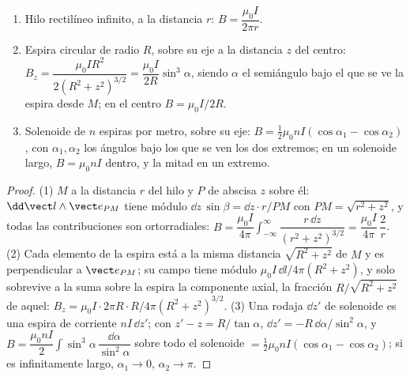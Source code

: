 \begin{proposition}\label{prop:b1:magnetostatics:three}
\begin{enumerate}
  \item Hilo rectilíneo infinito, a la distancia $r$: $B = \dfrac{\mu_0I}{2\pi r}$.
  \item Espira circular de radio $R$, sobre su eje a la distancia $z$ del
        centro: $B_z = \dfrac{\mu_0IR^2}{2(R^2 + z^2)^{3/2}} = \dfrac{\mu_0I}{2R}
        \sin^3\alpha$, siendo $\alpha$ el semiángulo bajo el que se ve la
        espira desde $M$; en el centro $B = \mu_0I/2R$.
  \item Solenoide de $n$ espiras por metro, sobre su eje: $B = \tfrac12\mu_0nI
        (\cos\alpha_1 - \cos\alpha_2)$, con $\alpha_1, \alpha_2$ los ángulos bajo
        los que se ven los dos extremos; en un solenoide largo, $B = \mu_0nI$
        dentro, y la mitad en un extremo.
\end{enumerate}
\end{proposition}

\begin{proof}
(1) $M$ a la distancia $r$ del hilo y $P$ de abscisa $z$ sobre él:
$\dd\vect l\wedge\vect e_{PM}$ tiene módulo $\dd z\,\sin\beta = \dd z\cdot r/PM$
con $PM = \sqrt{r^2 + z^2}$, y todas las contribuciones son ortorradiales:
$B = \dfrac{\mu_0I}{4\pi}\displaystyle\int_{-\infty}^{\infty}\dfrac{r\,\dd z}{(r^2 + z^2)^{3/2}}
= \dfrac{\mu_0I}{4\pi}\,\dfrac{2}{r}$. (2) Cada elemento de la espira está
a la misma distancia $\sqrt{R^2 + z^2}$ de $M$ y es perpendicular a
$\vect e_{PM}$; su campo tiene módulo $\mu_0I\,\dd l/4\pi(R^2 + z^2)$, y solo
sobrevive a la suma sobre la espira la componente axial, la fracción
$R/\sqrt{R^2 + z^2}$ de aquel: $B_z = \mu_0I\cdot2\pi R\cdot R/4\pi(R^2 +
z^2)^{3/2}$. (3) Una rodaja $\dd z'$ de solenoide es una espira de
corriente $nI\,\dd z'$; con $z' - z = R/\tan\alpha$, $\dd z' = -R\,\dd\alpha/\sin^2\alpha$,
y $B = \dfrac{\mu_0nI}{2}\displaystyle\int\sin^3\alpha\,\dfrac{\dd\alpha}{\sin^2\alpha}$ sobre
todo el solenoide $= \tfrac12\mu_0nI(\cos\alpha_1 - \cos\alpha_2)$; si es
infinitamente largo, $\alpha_1 \to 0$, $\alpha_2 \to \pi$.
\end{proof}

